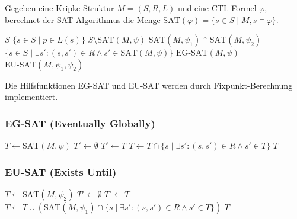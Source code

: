 ﻿\documentclass[a4paper,12pt]{article}
\theoremstyle{definition}
\begin{document}
Gegeben eine Kripke-Struktur $M = (S, R, L)$ und eine CTL-Formel $\varphi$, berechnet der SAT-Algorithmus die Menge $\text{SAT}(\varphi) = \{s \in S \mid M, s \models \varphi\}$.

\begin{algorithm}[H]
	\caption{CTL-Modellprüfung (SAT-Algorithmus)}
	\begin{algorithmic}[1]
		\State \Return $S$
		\State \Return $\{s \in S \mid p \in L(s)\}$
		\SonstWenn{$\varphi = \neg\psi$}
		\State \Return $S \setminus \text{SAT}(M, \psi)$
		\State \Return $\text{SAT}(M, \psi_1) \cap \text{SAT}(M, \psi_2)$
		\State \Return $\{s \in S \mid \exists s': (s,s') \in R \land s' \in \text{SAT}(M, \psi)\}$
		\State \Return $\text{EG-SAT}(M, \psi)$
		\State \Return $\text{EU-SAT}(M, \psi_1, \psi_2)$
		\EndeWenn
		\EndProzedur
	\end{algorithmic}
\end{algorithm}

Die Hilfsfunktionen EG-SAT und EU-SAT werden durch Fixpunkt-Berechnung implementiert.

\subsubsection{EG-SAT (Eventually Globally)}

\begin{algorithm}[H]
	\caption{EG-SAT-Berechnung}
	\begin{algorithmic}[1]
		\State $T \gets \text{SAT}(M, \psi)$ 
		\State $T' \gets \emptyset$
		\State $T' \gets T$
		\State $T \gets T \cap \{s \mid \exists s': (s,s') \in R \land s' \in T\}$ 
		\EndeWaehrend
		\State \Return $T$
		\EndProzedur
	\end{algorithmic}
\end{algorithm}

\subsubsection{EU-SAT (Exists Until)}

\begin{algorithm}[H]
	\caption{EU-SAT-Berechnung}
	\begin{algorithmic}[1]
		\State $T \gets \text{SAT}(M, \psi_2)$ 
		\State $T' \gets \emptyset$
		\State $T' \gets T$
		\State $T \gets T \cup (\text{SAT}(M, \psi_1) \cap \{s \mid \exists s': (s,s') \in R \land s' \in T\})$
		\EndeWaehrend
		\State \Return $T$
		\EndProzedur
	\end{algorithmic}
\end{algorithm}
\end{document}
